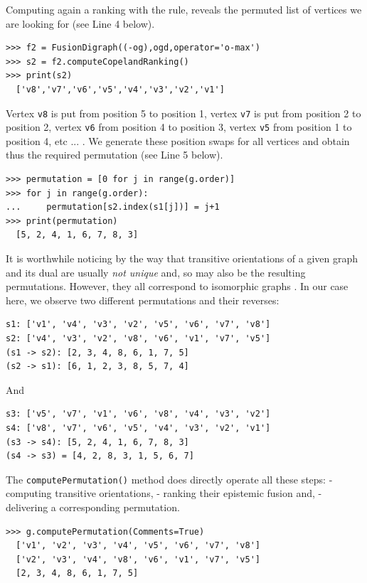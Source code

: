 Computing again a ranking with the \Copeland rule, reveals the permuted list of vertices we are looking for (see Line 4 below).
\begin{lstlisting}
>>> f2 = FusionDigraph((-og),ogd,operator='o-max')
>>> s2 = f2.computeCopelandRanking()
>>> print(s2)
  ['v8','v7','v6','v5','v4','v3','v2','v1']
\end{lstlisting}
Vertex \texttt{v8} is put from position 5 to position 1, vertex \texttt{v7} is put from position 2 to position 2, vertex \texttt{v6} from position 4 to position 3, vertex \texttt{v5} from position 1 to position 4, etc ... . We generate these position swaps for all vertices and obtain thus the required permutation (see Line 5 below).
\begin{lstlisting}
>>> permutation = [0 for j in range(g.order)]
>>> for j in range(g.order):
...     permutation[s2.index(s1[j])] = j+1
>>> print(permutation)
  [5, 2, 4, 1, 6, 7, 8, 3]
\end{lstlisting}

It is worthwhile noticing by the way that transitive orientations of a given graph and its dual are usually \emph{not unique} and, so may also be the resulting permutations. However, they all correspond to isomorphic graphs \citep{GOL-2004}. In our case here, we observe two different permutations and their reverses:
\begin{lstlisting}
s1: ['v1', 'v4', 'v3', 'v2', 'v5', 'v6', 'v7', 'v8']
s2: ['v4', 'v3', 'v2', 'v8', 'v6', 'v1', 'v7', 'v5']
(s1 -> s2): [2, 3, 4, 8, 6, 1, 7, 5]
(s2 -> s1): [6, 1, 2, 3, 8, 5, 7, 4]
\end{lstlisting}
And
\begin{lstlisting}  
s3: ['v5', 'v7', 'v1', 'v6', 'v8', 'v4', 'v3', 'v2']
s4: ['v8', 'v7', 'v6', 'v5', 'v4', 'v3', 'v2', 'v1']
(s3 -> s4): [5, 2, 4, 1, 6, 7, 8, 3]
(s4 -> s3) = [4, 2, 8, 3, 1, 5, 6, 7]
\end{lstlisting}
The \texttt{computePermutation()} method does directly operate all these steps: - computing transitive orientations, - ranking their epistemic fusion and, - delivering a corresponding permutation.
\begin{lstlisting}  
>>> g.computePermutation(Comments=True)
  ['v1', 'v2', 'v3', 'v4', 'v5', 'v6', 'v7', 'v8']
  ['v2', 'v3', 'v4', 'v8', 'v6', 'v1', 'v7', 'v5']
  [2, 3, 4, 8, 6, 1, 7, 5]
\end{lstlisting}


